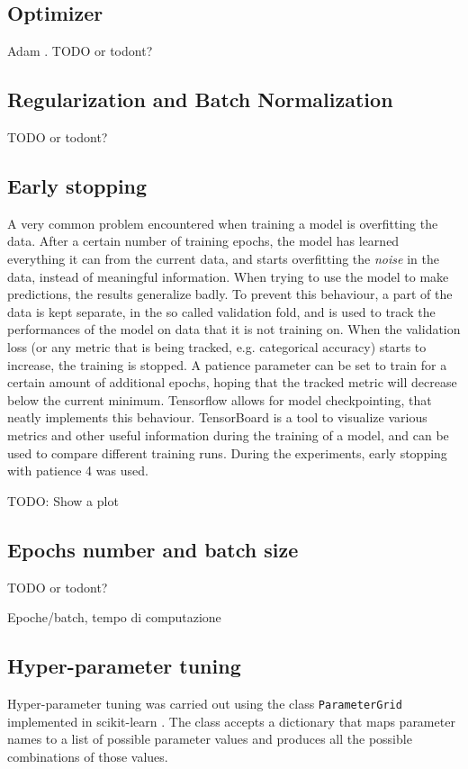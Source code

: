 \subsection{Optimizer}
Adam \cite{kingma2017adam}.
TODO or todont?

\subsection{Regularization and Batch Normalization}
TODO or todont?

\subsection{Early stopping}

A very common problem encountered when training a model is overfitting the
data. After a certain number of training epochs, the model has learned
everything it can from the current data, and starts overfitting the
\textit{noise} in the data, instead of meaningful information.
When trying to use the model to make predictions, the results generalize badly.
To prevent this behaviour, a part of the data is kept separate, in the so
called validation fold, and is used to track the performances of the model on
data that it is not training on.
When the validation loss (or any metric that is being tracked, e.g. categorical
accuracy) starts to increase, the training is stopped.
A patience parameter can be set to train for a certain amount of additional
epochs, hoping that the tracked metric will decrease below the current minimum.
Tensorflow allows for model checkpointing, that neatly implements this
behaviour.
TensorBoard is a tool to visualize various metrics and other useful information
during the training of a model, and can be used to compare different training
runs.
During the experiments, early stopping with patience 4 was used.

TODO: Show a plot

\subsection{Epochs number and batch size}
TODO or todont?

Epoche/batch, tempo di computazione

\subsection{Hyper-parameter tuning}

Hyper-parameter tuning was carried out using the class \texttt{ParameterGrid}
implemented in scikit-learn \cite{scikit-learn}.
The class accepts a dictionary that maps parameter names to a list of possible
parameter values and produces all the possible combinations of those values.

